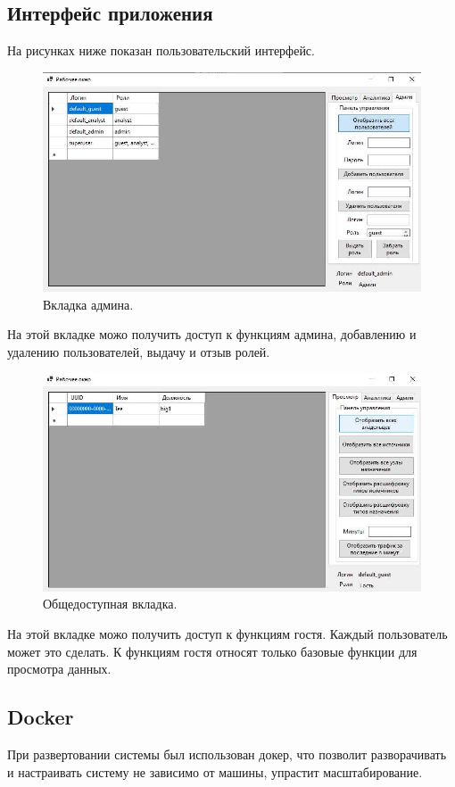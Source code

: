 \subsection{Интерфейс приложения}
На рисунках ниже показан пользовательский интерфейс.
\begin{figure}[H]
	\centering
	\includegraphics[scale=0.75]{admin.jpg}
	\caption{Вкладка админа.}
	\label{img:analytic}
\end{figure}
\indent На этой вкладке можо получить доступ к функциям админа, добавлению и удалению пользователей, выдачу и отзыв ролей.
\begin{figure}[H]
	\centering
	\includegraphics[scale=0.75]{guest.jpg}
	\caption{Общедоступная вкладка.}
	\label{img:manager}
\end{figure}
\indent На этой вкладке можо получить доступ к функциям гостя. Каждый пользователь может это сделать. К функциям гостя относят только базовые функции для просмотра данных.
\subsection{Docker}
При развертовании системы был использован докер, что позволит разворачивать и настраивать систему не зависимо от машины, упрастит масштабирование.
